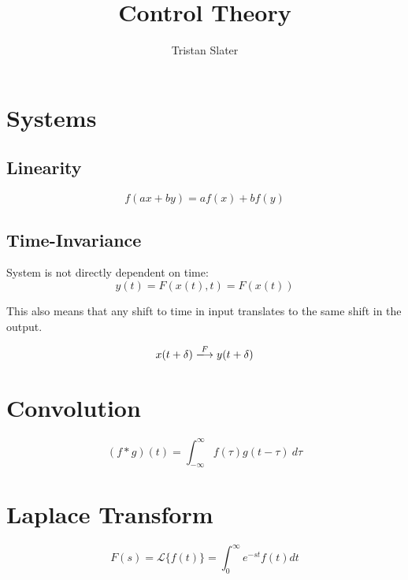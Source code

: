 \documentclass{article}
\title{Control Theory}
\author{Tristan Slater}
\begin{document}
    \maketitle

    \section{Systems}

    \subsection{Linearity}

    \begin{equation}
        f(ax + by) = af(x) + bf(y)
    \end{equation}

    \subsection{Time-Invariance}

    System is not directly dependent on time: \begin{equation}
        y(t) = F(x(t), t) = F(x(t))
    \end{equation}

    This also means that any shift to time in input translates to the same shift in the output.

    \begin{equation}
        x(t + \delta) \xlongrightarrow{F} y(t + \delta)
    \end{equation}

    \section{Convolution}

    \begin{equation}
        (f * g)(t) = \int_{-\infty}^\infty{f(\tau)g(t - \tau)\ d\tau}
    \end{equation}

    \section{Laplace Transform}

    \begin{equation}
        F(s) = \mathscr{L}\{f(t)\} = \int_0^\infty{e^{-st} f(t) dt}
    \end{equation}
\end{document}
